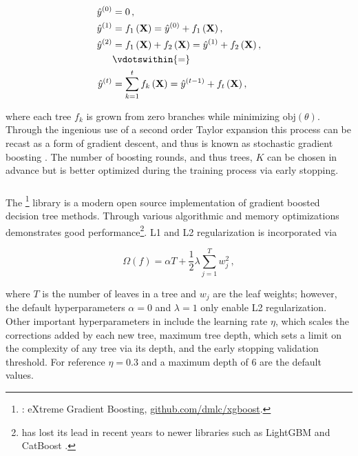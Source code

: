 \begin{equation} \label{eq:boosting}
\begin{aligned}
\hat{y}^{\left(0\right)} &= 0\,, \\
\hat{y}^{\left(1\right)} &= f_1\left(\mathbf{X}\right) = \hat{y}^{\left(0\right)} + f_1\left(\mathbf{X}\right), \\
\hat{y}^{\left(2\right)} &= f_1\left(\mathbf{X}\right) + f_2\left(\mathbf{X}\right)= \hat{y}^{\left(1\right)} + f_2\left(\mathbf{X}\right), \\
                           &\vdotswithin{\displaystyle =} \\
\hat{y}^{\left(t\right)} &= \sum_{k=1}^t f_k\left(\mathbf{X}\right)= \hat{y}^{\left(t-1\right)} + f_t\left(\mathbf{X}\right),
\end{aligned}
\end{equation}

\noindent where each tree $f_{k}$ is grown from zero branches while minimizing $\text{obj}\left(\theta\right)$.
Through the ingenious use of a second order Taylor expansion this process can
be recast as a form of gradient descent, and thus is known as
stochastic gradient boosting \cite{10.2307/2699986,FRIEDMAN2002367}.
The number of boosting rounds, and thus trees, $K$ can be chosen in advance
but is better optimized during the training process via early stopping.

\subsubsection{\xgboost}%
\label{ml:supervised:BDT:xgboost}

The \xgboost\footnote{\xgboost: eXtreme Gradient Boosting, \href{https://github.com/dmlc/xgboost}{github.com/dmlc/xgboost}.} library \cite{XGBoost}
is a modern open source implementation of gradient boosted decision tree methods.
Through various algorithmic and memory optimizations \xgboost demonstrates good performance\footnote{\xgboost has lost
its lead in recent years to newer libraries such as LightGBM \cite{LightGBM}
and CatBoost \cite{CatBoost}.}.
L1 and L2 regularization is incorporated via

\begin{equation}
\Omega\left(f\right) = \alpha T + \frac{1}{2}\lambda \sum_{j=1}^T w_j^2\,,
\end{equation}

\noindent where $T$ is the number of leaves in a tree and $w_{j}$ are the leaf weights;
however, the default hyperparameters $\alpha=0$ and $\lambda=1$ only enable L2 regularization.
Other important hyperparameters in \xgboost include the
learning rate $\eta$, which scales the corrections added by each new tree,
maximum tree depth, which sets a limit on the complexity of any tree via its depth,
and the early stopping validation threshold.
For reference $\eta=0.3$ and a maximum depth of 6 are the default values.

